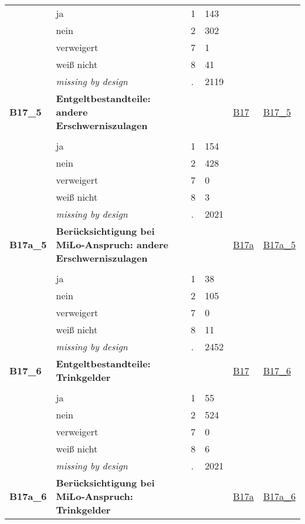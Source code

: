 \begin{longtable}{| L{2.45cm} | L{6cm} | C{1.5cm} | R{1cm} | C{2.25cm} | C{2.25cm} |}
   & ja & 1 & 143 &  &  \\ 
   & nein & 2 & 302 &  &  \\ 
   & verweigert & 7 & 1 &  &  \\ 
   & weiß nicht & 8 & 41 &  &  \\ 
   & \textit{missing by design} & \textit{.} & 2119 &  &  \\ 
   \midrule
\textbf{B17\_5}\label{var:B17:5} & \textbf{Entgeltbestandteile: andere Erschwerniszulagen} &  &  & \hyperref[B17]{B17} & \hyperref[var:suf:B17:5]{B17\_5} \\ 
   &  &  &  &  &  \\ 
   & ja & 1 & 154 &  &  \\ 
   & nein & 2 & 428 &  &  \\ 
   & verweigert & 7 & 0 &  &  \\ 
   & weiß nicht & 8 & 3 &  &  \\ 
   & \textit{missing by design} & \textit{.} & 2021 &  &  \\ 
   \midrule
\textbf{B17a\_5}\label{var:B17a:5} & \textbf{Berücksichtigung bei MiLo-Anspruch: andere Erschwerniszulagen} &  &  & \hyperref[B17a]{B17a} & \hyperref[var:suf:B17a:5]{B17a\_5} \\ 
   &  &  &  &  &  \\ 
   & ja & 1 & 38 &  &  \\ 
   & nein & 2 & 105 &  &  \\ 
   & verweigert & 7 & 0 &  &  \\ 
   & weiß nicht & 8 & 11 &  &  \\ 
   & \textit{missing by design} & \textit{.} & 2452 &  &  \\ 
   \midrule
\textbf{B17\_6}\label{var:B17:6} & \textbf{Entgeltbestandteile: Trinkgelder} &  &  & \hyperref[B17]{B17} & \hyperref[var:suf:B17:6]{B17\_6} \\ 
   &  &  &  &  &  \\ 
   & ja & 1 & 55 &  &  \\ 
   & nein & 2 & 524 &  &  \\ 
   & verweigert & 7 & 0 &  &  \\ 
   & weiß nicht & 8 & 6 &  &  \\ 
   & \textit{missing by design} & \textit{.} & 2021 &  &  \\ 
   \midrule
\textbf{B17a\_6}\label{var:B17a:6} & \textbf{Berücksichtigung bei MiLo-Anspruch: Trinkgelder} &  &  & \hyperref[B17a]{B17a} & \hyperref[var:suf:B17a:6]{B17a\_6} \\ 

\end{longtable}
